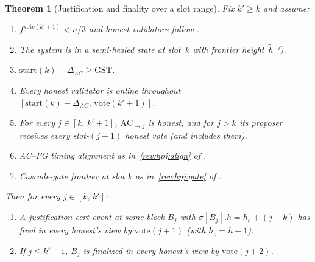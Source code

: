 \documentclass{article}
\newcommand{\start}{\ensuremath{\mathrm{start}}}
\newcommand{\vote}{\ensuremath{\mathrm{vote}}}
\newcommand{\GST}{\ensuremath{\mathrm{GST}}\xspace}
\newcommand{\comm}[1]{\ensuremath{\widetilde{#1}}}
\theoremstyle{plain}
\newtheorem{theorem}{Theorem}
\theoremstyle{definition}
\theoremstyle{remark}
\begin{document}
\begin{theorem}[Justification and finality over a slot range]\label{thm:on-chain-range}
Fix $k' \geq k$ and assume:
\begin{enumerate}
  \item $f^{\vote(k'+1)} < n/3$ and honest validators follow .
  \item The system is in a semi-healed state at slot~$k$ with frontier height~$\comm{h}$ ().
  \item $\start(k) - \Delta_{\mathit{AC}} \geq \GST$.
  \item Every honest validator is online throughout $[\start(k) - \Delta_{\mathit{AC}},\, \vote(k'+1)]$.
  \item\label{rev:thm:ac-chain} For every $j \in [k,\, k'+1]$, $\mathrm{AC}_{\to j}$ is honest, and for $j > k$ its proposer receives every slot-$(j-1)$ honest vote (and includes them).
  \item AC--FG timing alignment as in~\ref{rev:hpj:align} of .
  \item Cascade-gate frontier at slot $k$ as in~\ref{rev:hpj:gate} of .
\end{enumerate}

Then for every $j \in [k,\, k']$:
\begin{enumerate}
  \item[\textnormal{(T1)}] A justification cert event at some block $B_j$ with $\sigma[B_j].h = h_c + (j - k)$ has fired in every honest's view by $\vote(j+1)$ (with $h_c = \comm{h} + 1$).
  \item[\textnormal{(T2)}] If $j \leq k' - 1$, $B_j$ is finalized in every honest's view by $\vote(j+2)$.
\end{enumerate}
\end{theorem}
\end{document}
